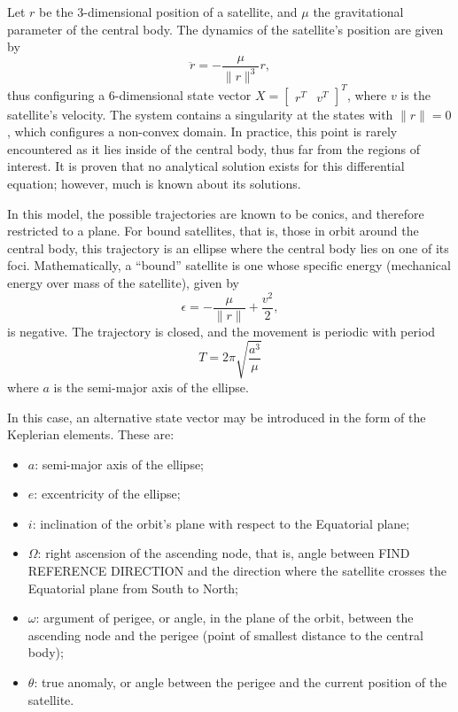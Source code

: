 Let \(r\) be the 3-dimensional position of a satellite, and \(\mu \) the gravitational parameter of the central body. The dynamics of the satellite's position are given by
\begin{equation} \label{eq:kepler_dyn}
    \ddot{r} = -\frac{\mu}{\lVert r \rVert^3} r,
\end{equation}
thus configuring a 6-dimensional state vector \(X = \begin{bmatrix}
    r^T & v^T
\end{bmatrix}^T\), where \(v\) is the satellite's velocity. The system contains a singularity at the states with \(\lVert r \rVert = 0\), which configures a non-convex domain. In practice, this point is rarely encountered as it lies inside of the central body, thus far from the regions of interest. It is proven that no analytical solution exists for this differential equation; however, much is known about its solutions.

In this model, the possible trajectories are known to be conics, and therefore restricted to a plane. For bound satellites, that is, those in orbit around the central body, this trajectory is an ellipse where the central body lies on one of its foci. Mathematically, a ``bound'' satellite is one whose specific energy (mechanical energy over mass of the satellite), given by
\begin{equation}
    \epsilon = -\frac{\mu}{\lVert r \rVert} + \frac{v^2}{2},
\end{equation}
is negative. The trajectory is closed, and the movement is periodic with period
\begin{equation}
    T = 2\pi \sqrt{\frac{a^3}{\mu}}
\end{equation}
where \(a\) is the semi-major axis of the ellipse.

In this case, an alternative state vector may be introduced in the form of the Keplerian elements. These are:
\begin{itemize}
    \item \(a\): semi-major axis of the ellipse;
    \item \(e\): excentricity of the ellipse;
    \item \(i\): inclination of the orbit's plane with respect to the Equatorial plane;
    \item \(\Omega \): right ascension of the ascending node, that is, angle between FIND REFERENCE DIRECTION and the direction where the satellite crosses the Equatorial plane from South to North;
    \item \(\omega \): argument of perigee, or angle, in the plane of the orbit, between the ascending node and the perigee (point of smallest distance to the central body);
    \item \(\theta \): true anomaly, or angle between the perigee and the current position of the satellite.
\end{itemize}

